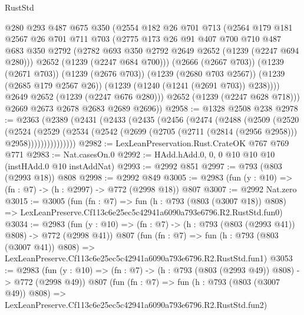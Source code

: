 \begin{lexlean}{RustStd}
\begin{coremodule}
            @280
            @293
            @487
            @675
            @350
            (@2554
              @182
              @26
              @701
              @713
              (@2564
                @179
                @181
                @2567
                @26
                @701
                @711
                @703
                (@2775
                  @173
                  @26
                  @91
                  @407
                  @700
                  @710
                  @487
                  @683
                  @350
                  @2792
                  (@2782 @693 @350 @2792 @2649 @2652 (@1239 (@2247 @694 @280)))
                  @2652
                  (@1239 (@2247 @684 @700)))
                (@2666 (@2667 @703))
                (@1239 (@2671 @703))
                (@1239 (@2676 @703))
                (@1239 (@2680 @703 @2567))
                (@1239 (@2685 @179 @2567 @26))
                (@1239 (@1240 (@1241 (@2691 @703)) @238))))
            @2649
            @2652
            (@1239 (@2247 @676 @280)))
          @2652
          (@1239 (@2247 @628 @718)))
        @2669
        @2673
        @2678
        @2683
        @2689
        @2696))
@2958 := @1328 @2508 @238
@2978 := @2363
    (@2389
      (@2431
        (@2433
          (@2435
            (@2456
              (@2474
                (@2488
                  (@2509
                    (@2520
                      (@2524
                        (@2529
                          (@2534
                            (@2542 (@2699 (@2705 (@2711 (@2814 (@2956 @2958))) @2958)))))))))))))))
@2982 := LexLeanPreservation.Rust.CrateOK @767 @769 @771
@2983 := Nat.casesOn.{0}
@2992 := HAdd.hAdd.{0, 0, 0} @10 @10 @10 (instHAdd.{0} @10 instAddNat)
@2993 := @2992 @851
@2997 := @793 (@803 (@2993 @18)) @808
@2998 := @2992 @849
@3005 := @2983 (fun (y : @10) => (fn : @7) -> (h : @2997) -> @772 (@2998 @18)) @807
@3007 := @2992 Nat.zero
@3015 := @3005
    (fun (fn : @7) =>
    fun (h : @793 (@803 (@3007 @18)) @808) =>
    LexLeanPreserve.Cf113c6e25ec5c42941a6090a793e6796.R2.RustStd.fun0)
@3034 := @2983
    (fun (y : @10) => (fn : @7) -> (h : @793 (@803 (@2993 @41)) @808) -> @772 (@2998 @41))
    @807
    (fun (fn : @7) =>
    fun (h : @793 (@803 (@3007 @41)) @808) =>
    LexLeanPreserve.Cf113c6e25ec5c42941a6090a793e6796.R2.RustStd.fun1)
@3053 := @2983
    (fun (y : @10) => (fn : @7) -> (h : @793 (@803 (@2993 @49)) @808) -> @772 (@2998 @49))
    @807
    (fun (fn : @7) =>
    fun (h : @793 (@803 (@3007 @49)) @808) =>
    LexLeanPreserve.Cf113c6e25ec5c42941a6090a793e6796.R2.RustStd.fun2)

\end{coremodule}
\end{lexlean}
